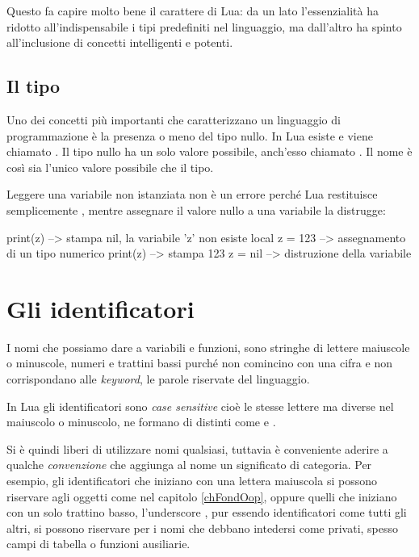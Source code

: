 Questo fa capire molto bene il carattere di Lua: da un lato l'essenzialità ha
ridotto all'indispensabile i tipi predefiniti nel linguaggio, ma dall'altro ha
spinto all'inclusione di concetti intelligenti e potenti.


\subsection{Il tipo }
\label{secFondTipoNil}

Uno dei concetti più importanti che caratterizzano un linguaggio di
programmazione è la presenza o meno del tipo nullo. In Lua esiste e viene
chiamato . Il tipo nullo ha un solo valore possibile,
anch'esso chiamato . Il nome è così sia l'unico valore possibile che il
tipo.

Leggere una variabile non istanziata non è un errore perché Lua restituisce
semplicemente , mentre assegnare il valore nullo a una variabile la
distrugge:
\begin{lines}
print(z)      --> stampa nil, la variabile 'z' non esiste
local z = 123 --> assegnamento di un tipo numerico
print(z)      --> stampa 123
z = nil       --> distruzione della variabile
\end{lines}


\section{Gli identificatori}

I nomi che possiamo dare a variabili e funzioni, sono stringhe di lettere
maiuscole o minuscole, numeri e trattini bassi \key{\_}\luas{\_} purché non
comincino con una cifra e non corrispondano alle \emph{keyword}, le parole
riservate del linguaggio.

In Lua gli identificatori sono \emph{case sensitive} cioè le stesse lettere ma
diverse nel maiuscolo o minuscolo, ne formano di distinti come  e
.

Si è quindi liberi di utilizzare nomi qualsiasi, tuttavia è conveniente aderire
a qualche \emph{convenzione} che aggiunga al nome un significato di categoria.
Per esempio, gli identificatori che iniziano con una lettera maiuscola si
possono riservare agli oggetti come nel capitolo \ref{chFondOop}, oppure quelli
che iniziano con un solo trattino basso, l'underscore \key{\_}, pur essendo
identificatori come tutti gli altri, si possono riservare per i nomi che debbano
intedersi come privati, spesso campi di tabella o funzioni ausiliarie.

